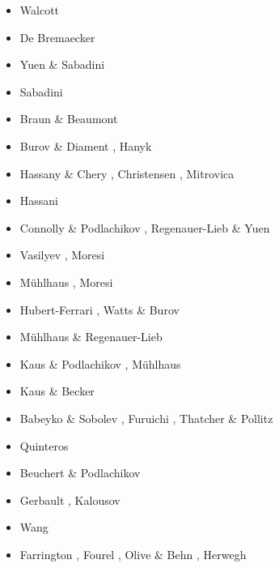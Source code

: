 \begin{scriptsize}
\begin{itemize}
\item[\nineteenseventy] Walcott \cite{walc70} 
\item[\nineteenseventyseven] De Bremaecker \cite{debr77}
\item[\nineteeneightyfour] Yuen \& Sabadini \cite{yusa84}
\item[\nineteeneightysix] Sabadini \etal \cite{sayp86}
\item[\nineteeneightyseven] Braun \& Beaumont \cite{brbe87}
\item[\nineteenninetyfive] Burov \& Diament \cite{budi95}, Hanyk \etal \cite{hamy95}
\item[\nineteenninetysix] Hassany \& Chery \cite{hach96b}, Christensen \cite{chri96b}, Mitrovica \cite{mitr96}
\item[\nineteenninetyseven] Hassani \etal \cite{hajc97}
\item[\nineteenninetyeight] Connolly \& Podlachikov \cite{copo98}, Regenauer-Lieb \& Yuen \cite{reyu98}
\item[\twothousandone] Vasilyev \etal \cite{vapy01}, Moresi \etal \cite{modm01}
\item[\twothousandtwo] M{\"u}hlhaus \etal \cite{mumh02}, Moresi \etal \cite{modm02}
\item[\twothousandthree] Hubert-Ferrari \etal \cite{hukm03}, Watts \& Burov \cite{wabu03}
\item[\twothousandfive] M{\"u}hlhaus \& Regenauer-Lieb \cite{mure05}
\item[\twothousandsix] Kaus \& Podlachikov \cite{kapo06}, M{\"u}hlhaus \etal \cite{mudm06}
\item[\twothousandseven] Kaus \& Becker \cite{kabe07}
\item[\twothousandeight] Babeyko \& Sobolev \cite{baso08}, Furuichi \etal \cite{fukk08}, 
                   Thatcher \& Pollitz \cite{thpo08}
\item[\twothousandnine] Quinteros \etal \cite{qurj09}
\item[\twothousandten] Beuchert \& Podlachikov \cite{bepo10}
\item[\twothousandtwelve] Gerbault \cite{gerb12}, Kalousov \etal \cite{kasc12}
\item[\twothousandthirteen] Wang \etal \cite{wahd13}
\item[\twothousandfourteen] Farrington \etal \cite{famc14}, Fourel \etal \cite{fogm14},
                      Olive \& Behn \cite{olbe14}, Herwegh \etal \cite{hepk14}

\end{itemize}
\end{scriptsize}
